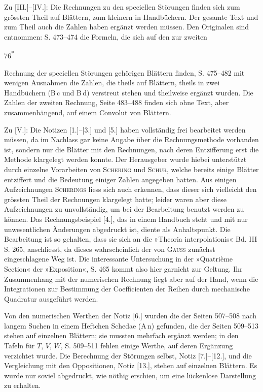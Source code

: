 \begingroup
{}
\renewcommand{\headrulewidth}{0pt}
\par\noindent\hspace*{\parindent}Zu [III.]--[IV.]: Die Rechnungen zu den speciellen Störungen finden sich
zum grössten Theil auf Blättern, zum kleinern in Handbüchern. Der gesamte Text
und zum Theil auch die Zahlen haben ergänzt werden müssen. Den Originalen sind
entnommen: S. 473--474 die Formeln, die sich auf den zur zweiten
\par\smallskip\noindent\hfill 76\textsuperscript{*}\par
\noindent{}Rechnung der speciellen Störungen gehörigen Blättern finden,
S. 475--482 mit wenigen Ausnahmen die Zahlen, die theils auf Blättern, theils in
zwei Handbüchern (B\,c und B\,d) verstreut stehen und theilweise ergänzt wurden.
Die Zahlen der zweiten Rechnung, Seite 483--488 finden sich ohne Text,
aber zusammenhängend, auf einem Convolut von Blättern.

\par\noindent\hspace*{\parindent}Zu [V.]: Die Notizen [1.]--[3.] und [5.] haben vollständig frei bearbeitet
werden müssen, da im Nachlass gar keine Angabe über die Rechnungsmethode vorhanden
ist, sondern nur die Blätter mit den Rechnungen, nach deren Entzifferung erst die
Methode klargelegt werden konnte. Der Herausgeber wurde hiebei unterstützt durch
einzelne Vorarbeiten von \textsc{Schering} und \textsc{Schur}, welche bereits einige Blätter
entziffert und die Bedeutung einiger Zahlen angegeben hatten. Aus einigen
Aufzeichnungen \textsc{Scherings} liess sich auch erkennen, dass dieser sich vielleicht
den grössten Theil der Rechnungen klargelegt hatte; leider waren aber diese
Aufzeichnungen zu unvollständig, um bei der Bearbeitung benutzt werden zu können.
Das Rechnungsbeispiel [4.], das in einem Handbuch steht und mit nur unwesentlichen
Änderungen abgedruckt ist, diente als Anhaltspunkt. Die Bearbeitung ist so gehalten,
dass sie sich an die »Theoria interpolationis« Bd. III S. 265, anschliesst, da
dieses wahrscheinlich der von \textsc{Gauss} zunächst eingeschlagene Weg ist.
Die interessante Untersuchung in der »Quatrième Section« der »Exposition«, S. 465
kommt also hier garnicht zur Geltung. Ihr Zusammenhang mit der numerischen
Rechnung liegt aber auf der Hand, wenn die Integrationen zur Bestimmung der
Coefficienten der Reihen durch mechanische Quadratur ausgeführt werden.

\par\noindent\hspace*{\parindent}Von den numerischen Werthen der Notiz [6.] wurden die der Seiten 507--508
nach langem Suchen in einem Heftchen Schedae (A\,n) gefunden, die der Seiten 509--513
stehen auf einzelnen Blättern; sie mussten mehrfach ergänzt werden; in den Tafeln
für \(T\), \(V\), \(W\), S. 509--511 fehlen einige Werthe, auf deren Ergänzung verzichtet wurde.
Die Berechnung der Störungen selbst, Notiz [7.]--[12.], und die Vergleichung mit
den Oppositionen, Notiz [13.], stehen auf einzelnen Blättern. Es wurde nur soviel
abgedruckt, wie nöthig erschien, um eine lückenlose Darstellung zu erhalten.

